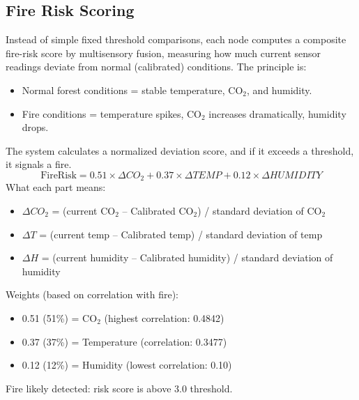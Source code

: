 \subsection{Fire Risk Scoring}
Instead of simple fixed threshold comparisons, each node computes a composite
fire-risk score by multisensory fusion, measuring how much current sensor
readings deviate from normal (calibrated) conditions.
The principle is:
\begin{itemize}
    \item Normal forest conditions = stable temperature, CO$_2$, and
    humidity.
    \item Fire conditions = temperature spikes, CO$_2$ increases
    dramatically, humidity drops.
\end{itemize}
The system calculates a normalized deviation score, and if it exceeds a
threshold, it signals a fire.
\begin{equation}
    \text{FireRisk} = 0.51 \times \Delta CO_2 + 0.37 \times \Delta TEMP +
    0.12 \times \Delta HUMIDITY
\end{equation}
What each part means:
\begin{itemize}
    \item $\Delta CO_2$ = (current CO$_2$ -- Calibrated CO$_2$) / standard
    deviation of CO$_2$
    \item $\Delta T$ = (current temp -- Calibrated temp) / standard deviation
    of temp
    \item $\Delta H$ = (current humidity -- Calibrated humidity) / standard
    deviation of humidity
\end{itemize}
Weights (based on correlation with fire):
\begin{itemize}
    \item 0.51 (51\%) = CO$_2$ (highest correlation: 0.4842)
    \item 0.37 (37\%) = Temperature (correlation: 0.3477)
    \item 0.12 (12\%) = Humidity (lowest correlation: 0.10)
\end{itemize}
Fire likely detected: risk score is above 3.0 threshold.